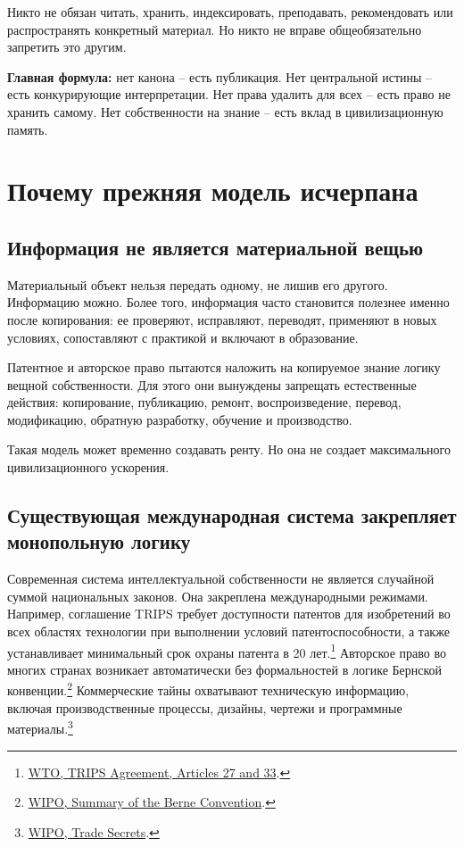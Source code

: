 \documentclass[11pt,a4paper]{article}
\begin{document}
Никто не обязан читать, хранить, индексировать, преподавать, рекомендовать или распространять конкретный материал. Но никто не вправе общеобязательно запретить это другим.

\begin{executivebox}
\textbf{Главная формула:} нет канона -- есть публикация. Нет центральной истины -- есть конкурирующие интерпретации. Нет права удалить для всех -- есть право не хранить самому. Нет собственности на знание -- есть вклад в цивилизационную память.
\end{executivebox}

\section{Почему прежняя модель исчерпана}

\subsection{Информация не является материальной вещью}

Материальный объект нельзя передать одному, не лишив его другого. Информацию можно. Более того, информация часто становится полезнее именно после копирования: ее проверяют, исправляют, переводят, применяют в новых условиях, сопоставляют с практикой и включают в образование.

Патентное и авторское право пытаются наложить на копируемое знание логику вещной собственности. Для этого они вынуждены запрещать естественные действия: копирование, публикацию, ремонт, воспроизведение, перевод, модификацию, обратную разработку, обучение и производство.

Такая модель может временно создавать ренту. Но она не создает максимального цивилизационного ускорения.

\subsection{Существующая международная система закрепляет монопольную логику}

Современная система интеллектуальной собственности не является случайной суммой национальных законов. Она закреплена международными режимами. Например, соглашение TRIPS требует доступности патентов для изобретений во всех областях технологии при выполнении условий патентоспособности, а также устанавливает минимальный срок охраны патента в 20 лет.\footnote{\href{https://www.wto.org/english/docs_e/legal_e/27-trips_04c_e.htm}{WTO, TRIPS Agreement, Articles 27 and 33}.} Авторское право во многих странах возникает автоматически без формальностей в логике Бернской конвенции.\footnote{\href{https://www.wipo.int/en/web/treaties/ip/berne/summary_berne}{WIPO, Summary of the Berne Convention}.} Коммерческие тайны охватывают техническую информацию, включая производственные процессы, дизайны, чертежи и программные материалы.\footnote{\href{https://www.wipo.int/en/web/trade-secrets}{WIPO, Trade Secrets}.}
\end{document}
